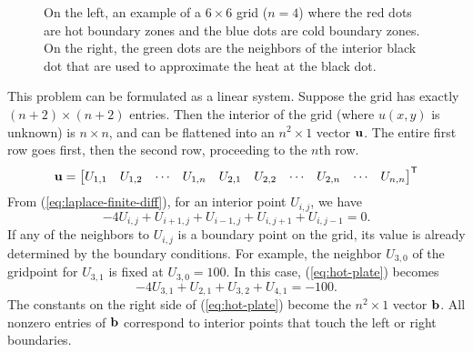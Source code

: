 \begin{figure}
\centering
{}
\caption{On the left, an example of a $6\times 6$ grid ($n=4$) where the red dots are hot boundary zones and the blue dots are cold boundary zones.
On the right, the green dots are the neighbors of the interior black dot that are used to approximate the heat at the black dot.}
\label{fig:itersolve-finite-difference-grid}
\end{figure}
%
This problem can be formulated as a linear system.
Suppose the grid has exactly $(n+2)\times (n+2)$ entries.
Then the interior of the grid (where $u(x,y)$ is unknown) is $n\times n$, and can be flattened into an $n^2\times 1$ vector $\mathbf{u}$.
The entire first row goes first, then the second row, proceeding to the $n$th row.
\[\mathbf{u} = \begin{bmatrix}U_{1,1} & U_{1,2} & \cdots & U_{1,n} & U_{2,1} & U_{2,2} & \cdots & U_{2,n} & \cdots & U_{n,n}\end{bmatrix}^{\mathsf T}\]
From (\ref{eq:laplace-finite-diff}), for an interior point $U_{i,j}$, we have
\begin{equation}
-4U_{i,j} + U_{i+1,j} + U_{i-1,j} + U_{i,j+1} +  U_{i,j-1} = 0.
\label{eq:hot-plate}
\end{equation}
If any of the neighbors to $U_{i,j}$ is a boundary point on the grid, its value is already determined by the boundary conditions.
For example, the neighbor $U_{3,0}$ of the gridpoint for $U_{3,1}$ is fixed at $U_{3,0} = 100$.
In this case, (\ref{eq:hot-plate}) becomes
\[
-4U_{3,1} + U_{2,1} + U_{3,2} + U_{4,1} = -100.
\]
The constants on the right side of (\ref{eq:hot-plate}) become the $n^2\times 1$ vector $\mathbf{b}$.
All nonzero entries of $\mathbf{b}$ correspond to interior points that touch the left or right boundaries.

